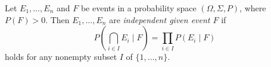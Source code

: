 \begin{definition}
  Let $E_1, \dots, E_n$ and $F$ be events in a probability space
  $(\Omega, \Sigma, P)$, where $P(F) > 0$.
  Then $E_1, \dots, E_n$ are \emph{independent given event $F$} if
  \begin{equation*}
    P\left(\bigcap_{i \in I} E_i \;\Bigg|\; F\right)
    = \prod_{i \in I} P(E_i \mid F)
  \end{equation*}
  holds for any nonempty subset $I$ of $\{1, \dots, n\}$.
\end{definition}